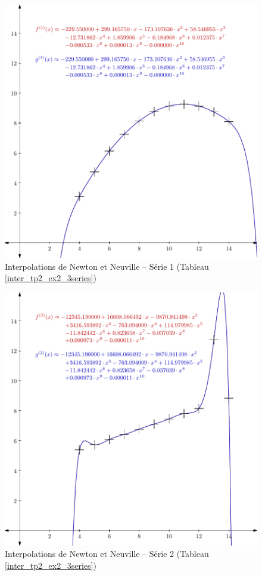 \documentclass{report}
\begin{document}
	\begin{figure}[h]
	  \centering
  	\includegraphics[scale=0.5]{graphiques/pdf_output/inter_tp2_ex2_1.pdf}
	  \caption{Interpolations de Newton et Neuville -- Série 1 (Tableau \ref{inter_tp2_ex2_3series})}
	\end{figure}
	\begin{figure}[h]
	  \centering
	  \includegraphics[scale=0.5]{graphiques/pdf_output/inter_tp2_ex2_2.pdf}
	  \caption{Interpolations de Newton et Neuville -- Série 2 (Tableau \ref{inter_tp2_ex2_3series})}
	\end{figure}
\end{document}
